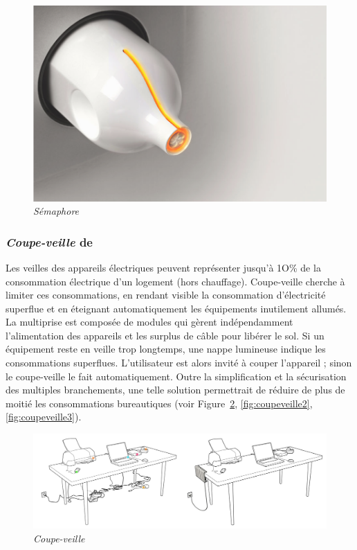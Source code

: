 \documentclass[10pt,a5paper,twoside]{article}
\begin{document}
\begin{figure}
\centering
\includegraphics[]{images/semaphore-screenshot3.png}
\caption{\emph{Sémaphore}}\label{fig:semaphore3}
\end{figure}

\subsubsection{\emph{Coupe-veille} de
\citet{belley2006coupe}}\label{coupe-veille-de-belley2006coupe}

Les veilles des appareils électriques peuvent représenter jusqu'à 1O\%
de la consommation électrique d'un logement (hors chauffage).
Coupe-veille cherche à limiter ces consommations, en rendant visible la
consommation d'électricité superflue et en éteignant automatiquement les
équipements inutilement allumés. La multiprise est composée de modules
qui gèrent indépendamment l'alimentation des appareils et les surplus de
câble pour libérer le sol. Si un équipement reste en veille trop
longtemps, une nappe lumineuse indique les consommations superflues.
L'utilisateur est alors invité à couper l'appareil ; sinon le
coupe-veille le fait automatiquement. Outre la simplification et la
sécurisation des multiples branchements, une telle solution permettrait
de réduire de plus de moitié les consommations bureautiques (voir
Figure~\ref{fig:coupeveille1}, \ref{fig:coupeveille2},
\ref{fig:coupeveille3}).

\begin{figure}
\centering
\includegraphics[]{images/coupeveille-screenshot1.png}
\caption{\emph{Coupe-veille}}\label{fig:coupeveille1}
\end{figure}
\end{document}
